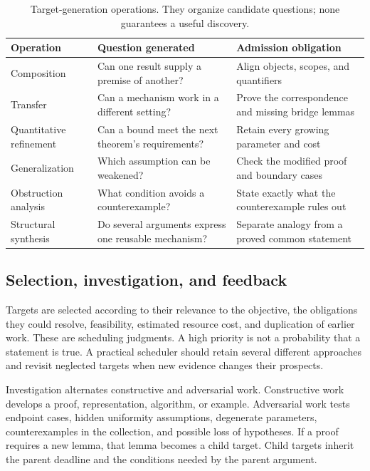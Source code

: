 \begin{table}[htbp]
\centering\small
\begin{tabularx}{\linewidth}{@{}p{2.6cm}YY@{}}
\toprule
Operation & Question generated & Admission obligation \\
\midrule
Composition & Can one result supply a premise of another? & Align objects, scopes, and quantifiers \\
Transfer & Can a mechanism work in a different setting? & Prove the correspondence and missing bridge lemmas \\
Quantitative refinement & Can a bound meet the next theorem's requirements? & Retain every growing parameter and cost \\
Generalization & Which assumption can be weakened? & Check the modified proof and boundary cases \\
Obstruction analysis & What condition avoids a counterexample? & State exactly what the counterexample rules out \\
Structural synthesis & Do several arguments express one reusable mechanism? & Separate analogy from a proved common statement \\
\bottomrule
\end{tabularx}
\caption{Target-generation operations. They organize candidate questions; none guarantees a useful discovery.}
\end{table}

\subsection{Selection, investigation, and feedback}

Targets are selected according to their relevance to the objective, the obligations they could resolve, feasibility, estimated resource cost, and duplication of earlier work. These are scheduling judgments. A high priority is not a probability that a statement is true. A practical scheduler should retain several different approaches and revisit neglected targets when new evidence changes their prospects.

Investigation alternates constructive and adversarial work. Constructive work develops a proof, representation, algorithm, or example. Adversarial work tests endpoint cases, hidden uniformity assumptions, degenerate parameters, counterexamples in the collection, and possible loss of hypotheses. If a proof requires a new lemma, that lemma becomes a child target. Child targets inherit the parent deadline and the conditions needed by the parent argument.

